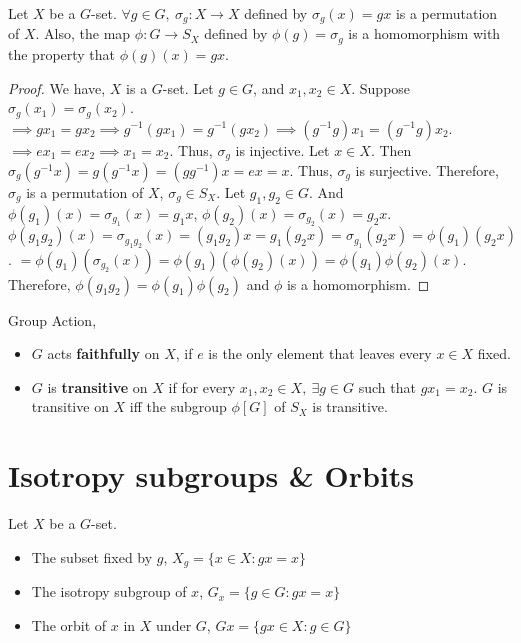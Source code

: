 \begin{theorem}
	Let $X$ be a $G$-set.
	$\forall g \in G,\ \sigma_g : X \to X$ defined by $\sigma_g(x) = gx$ is a permutation of $X$.
	Also, the map $\phi : G \to S_X$ defined by $\phi(g) = \sigma_g$ is a homomorphism with the property that $\phi(g)(x) = gx$.
\end{theorem}
\begin{proof}
	We have, $X$ is a $G$-set.
	Let $g \in G$, and $x_1,x_2 \in X$.
	Suppose $\sigma_g(x_1) = \sigma_g(x_2)$.
	$\implies gx_1 = gx_2 \implies g^{-1}(gx_1) = g^{-1}(gx_2) \implies (g^{-1}g)x_1 = (g^{-1}g)x_2$.
	$\implies ex_1 = ex_2 \implies x_1 = x_2$.
	Thus, $\sigma_g$ is injective.
	Let $x \in X$.
	Then $\sigma_g(g^{-1}x) = g(g^{-1}x) = (gg^{-1})x = ex = x$.
	Thus, $\sigma_g$ is surjective.
	Therefore, $\sigma_g$ is a permutation of $X$, $\sigma_g \in S_X$.
	Let $g_1,g_2 \in G$.
	And $\phi(g_1)(x) = \sigma_{g_1}(x) = g_1x$, $\phi(g_2)(x) = \sigma_{g_2}(x) = g_2x$.
	$\phi(g_1g_2)(x) = \sigma_{g_1g_2}(x) = (g_1g_2)x = g_1(g_2x) = \sigma_{g_1}(g_2x) = \phi(g_1)(g_2x)$.
	\hphantom{$\phi(g_1g_2)(x)$} $= \phi(g_1)(\sigma_{g_2}(x)) = \phi(g_1)(\phi(g_2)(x)) = \phi(g_1)\phi(g_2)(x)$.
	Therefore, $\phi(g_1g_2) = \phi(g_1)\phi(g_2)$ and $\phi$ is a homomorphism.
\end{proof}

\begin{definition}Group Action,
	\begin{itemize}
		\item $G$ acts \textbf{faithfully} on $X$, if $e$ is the only element that leaves every $x \in X$ fixed. 
		\item $G$ is \textbf{transitive} on $X$ if for every $x_1,x_2 \in X,\ \exists g \in G$ such that $gx_1 = x_2$.
			$G$ is transitive on $X$ iff the subgroup $\phi[G]$ of $S_X$ is transitive.
	\end{itemize}
\end{definition}

\section{Isotropy subgroups \& Orbits}
\begin{definition}Let $X$ be a $G$-set.
	\begin{itemize}
		\item The subset fixed by $g$, $X_g = \{ x \in X : gx = x \}$
		\item The isotropy subgroup of $x$, $G_x = \{ g \in G : gx = x \}$
		\item The orbit of $x$ in $X$ under $G$, $Gx = \{ gx \in X : g \in G \}$
	\end{itemize}
\end{definition}

